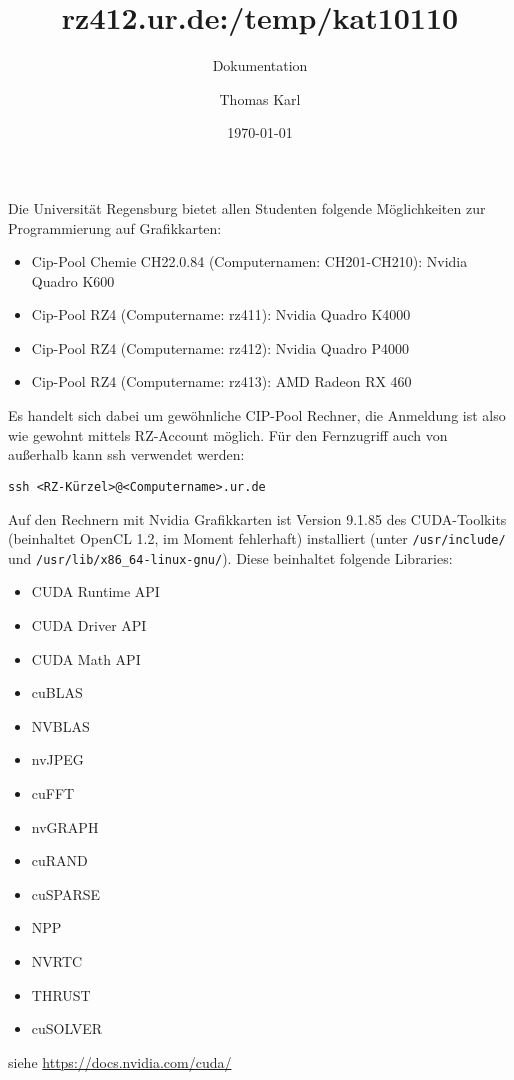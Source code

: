 \documentclass[headsepline=3pt,headinclude=true,12pt,oneside]{scrartcl}
\author{Thomas Karl}
\title{rz412.ur.de:/temp/kat10110}
\subtitle{Dokumentation}
\date{\today}
\let\li=\lstinline
\begin{document}
	\maketitle
	
	Die Universität Regensburg bietet allen Studenten folgende Möglichkeiten zur Programmierung auf Grafikkarten:
	\begin{itemize}
    	\item Cip-Pool Chemie CH22.0.84 (Computernamen: CH201-CH210): Nvidia Quadro K600
	    \item Cip-Pool RZ4 (Computername: rz411): Nvidia Quadro K4000
    	\item Cip-Pool RZ4 (Computername: rz412): Nvidia Quadro P4000
	    \item Cip-Pool RZ4 (Computername: rz413): AMD Radeon RX 460 
	\end{itemize}
	
	Es handelt sich dabei um gewöhnliche CIP-Pool Rechner, die Anmeldung ist also wie gewohnt mittels RZ-Account möglich. Für den Fernzugriff auch von außerhalb kann ssh verwendet werden:
	
	\begin{center} \li`ssh <RZ-Kürzel>@<Computername>.ur.de` \end{center}
	
	Auf den Rechnern mit Nvidia Grafikkarten ist Version 9.1.85 des CUDA-Toolkits (beinhaltet OpenCL 1.2, im Moment fehlerhaft) installiert (unter \li`/usr/include/` und \li`/usr/lib/x86_64-linux-gnu/`). 
	Diese beinhaltet folgende Libraries:
	\begin{itemize}
		\item CUDA Runtime API
		\item CUDA Driver API
		\item CUDA Math API
		\item cuBLAS 
		\item NVBLAS 
		\item nvJPEG 
		\item cuFFT 
		\item nvGRAPH 
		\item cuRAND 
		\item cuSPARSE 
		\item NPP 
		\item NVRTC 
		\item THRUST 
		\item cuSOLVER
	\end{itemize}
	siehe \url{https://docs.nvidia.com/cuda/}
	
\end{document}

